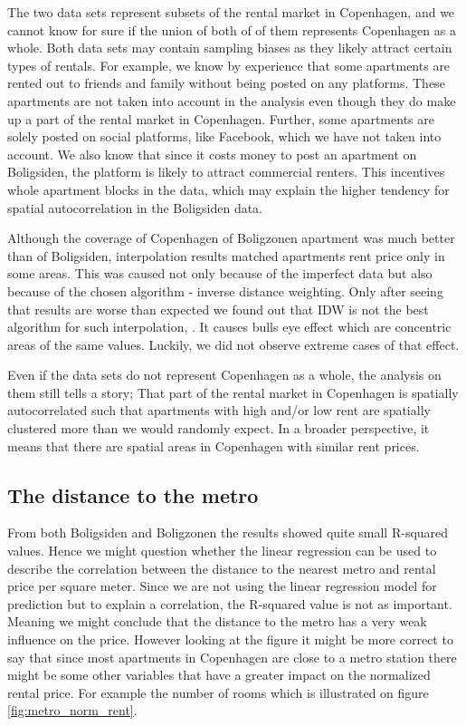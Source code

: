 \documentclass{article}
\begin{document}
The two data sets represent subsets of the rental market in Copenhagen, and we cannot know for sure if the union of both of of them represents Copenhagen as a whole. Both data sets may contain sampling biases as they likely attract certain types of rentals. For example, we know by experience that some apartments are rented out to friends and family without being posted on any platforms. These apartments are not taken into account in the analysis even though they do make up a part of the rental market in Copenhagen. Further, some apartments are solely posted on social platforms, like Facebook, which we have not taken into account. We also know that since it costs money to post an apartment on Boligsiden, the platform is likely to attract commercial renters. This incentives whole apartment blocks in the data, which may explain the higher tendency for spatial autocorrelation in the Boligsiden data. 

Although the coverage of Copenhagen of Boligzonen apartment was much better than of Boligsiden, interpolation results matched apartments rent price only in some areas. This was caused not only because of the imperfect data but also because of the chosen algorithm - inverse distance weighting. Only after seeing that results are worse than expected we found out that IDW is not the best algorithm for such interpolation, \cite{prices}. It causes bulls eye effect which are concentric areas of the same values. Luckily, we did not observe extreme cases of that effect.

Even if the data sets do not represent Copenhagen as a whole, the analysis on them still tells a story; That part of the rental market in Copenhagen is spatially autocorrelated such that apartments with high and/or low rent are spatially clustered more than we would randomly expect. In a broader perspective, it means that there are spatial areas in Copenhagen with similar rent prices.

\subsection{The distance to the metro}
From both Boligsiden and Boligzonen the results showed quite small R-squared values. Hence we might question whether the linear regression can be used to describe the correlation between the distance to the nearest metro and rental price per square meter. Since we are not using the linear regression model for prediction but to explain a correlation, the R-squared value is not as important. Meaning we might conclude that the distance to the metro has a very weak influence on the price. However looking at the figure it might be more correct to say that since most apartments in Copenhagen are close to a metro station there might be some other variables that have a greater impact on the normalized rental price. For example the number of rooms which is illustrated on figure \ref{fig:metro_norm_rent}. 
\end{document}
